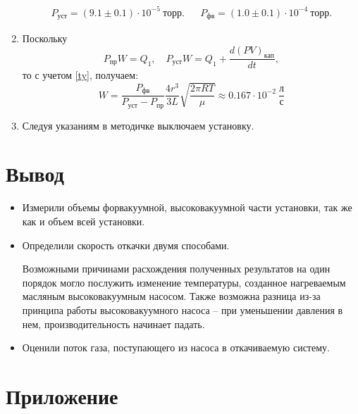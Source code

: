 \documentclass[a4paper,12pt]{article}
\theoremstyle{definition}
\begin{document}
\begin{enumerate}
		\begin{align}
			P_{уст} = (9.1 \pm 0.1) \cdot 10^{-5} ~ торр. && P_{фв} = (1.0 \pm 0.1) \cdot 10^{-4} ~ торр.
		\end{align}
		
		
		\item Поскольку
		$$P_{пр} W = Q_1, \quad P_{уст} W = Q_1 + \frac{d(PV)_{кап}}{dt},$$
		то с учетом \eqref{ty}, получаем:
		\begin{equation}
			W = \frac{P_{фв}}{P_{уст}-P_{пр}}\frac{4r^3}{3L}\sqrt{\frac{2\pi RT}{\mu}} \approx 0.167 \cdot 10^{-2}~\frac{л}{с}
		\end{equation}
		
		\item Следуя указаниям в методичке выключаем установку.
		
	\end{enumerate}
	
	\section{Вывод}
	\begin{itemize}
		\item Измерили объемы форвакуумной, высоковакуумной части установки, так же как и объем всей установки.
		
		\item Определили скорость откачки двумя способами.
		
		Возможными причинами расхождения полученных результатов на один порядок могло послужить изменение температуры, созданное нагреваемым масляным высоковакуумным насосом. Также возможна разница из-за принципа работы высоковакуумного насоса -- при уменьшении давления в нем, производительность начинает падать.
		
		\item Оценили поток газа, поступающего из насоса в откачиваемую систему.
		
		
		
		
	\end{itemize}
	
	\newpage
	
	\section{Приложение}
	
\end{document}
